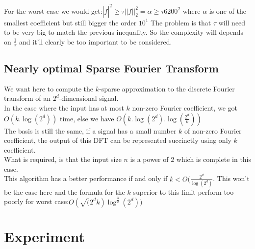 \documentclass{article}
\begin{document}
For the worst case we would get:$|\hat{f}|^2 \geq \tau||f||^{2}_2 =  \alpha \geq \tau 6200^2$ where $\alpha$ is one of the smallest coefficient but still bigger the order $10^1$  
The problem is that $\tau$ will need to be very big to match the previous inequality. So the complexity will depends on $\frac{1}{\tau}$ and it'll clearly be too important to be considered.\\


\subsection{Nearly optimal Sparse Fourier Transform}

We want here to compute the $k$-sparse approximation to the discrete Fourier transform of an $2^d$-dimensional signal.\\
In the case where the input has at most $k$ non-zero Fourier coefficient, we got $O(k.\log(2^d))$ time, else we have $O(k.\log(2^d).\log(\frac{2^d}{k}))$\\
The basis is still the same, if a signal has a small number $k$ of non-zero Fourier coefficient, the output of this DFT can be represented succinctly using only $k$ coefficient.\\
What is required, is that the input size $n$ is a power of 2 which is complete in this case.\\
This algorithm has a better performance if and only if $ k < O(\frac{2^d}{\log(2^d)}$. This won't be the case here and the formula for the $k$ superior to this limit perform too poorly for worst case:$O(\sqrt(2^d k) \log^{\frac{3}{2}}(2^d))$


\section*{Experiment}
\end{document}

